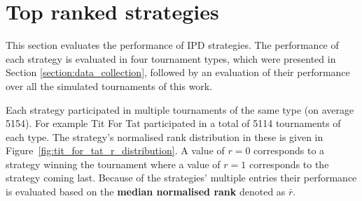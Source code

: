 \documentclass{article}
\newcommand{\numberofalltournaments}{}
\newcommand{\numberofstrategies}{}
\begin{document}
\begin{table}[!htbp]
    \begin{center}
\end{center}
\caption{Output result of a single tournament.}\label{table:output_result}
\end{table}

\section{Top ranked strategies}\label{section:top_performances}

This section evaluates the performance of \numberofstrategies IPD strategies. The performance of
each strategy is evaluated in four tournament types, which were presented in Section
\ref{section:data_collection}, followed by an evaluation of their performance
over all the \numberofalltournaments simulated tournaments of this work.

Each strategy participated in multiple tournaments of the same type (on average 5154).
For example Tit For Tat participated in a total of 5114
tournaments of each type. The strategy's normalised rank distribution in these
is given in Figure~\ref{fig:tit_for_tat_r_distribution}. A value of \(r =
0\) corresponds to a strategy winning the tournament where a value of
\(r = 1\) corresponds to the strategy coming last. Because of the strategies'
multiple entries their performance is evaluated based on the
\textbf{median normalised rank} denoted as \(\bar{r}\).
\end{document}
